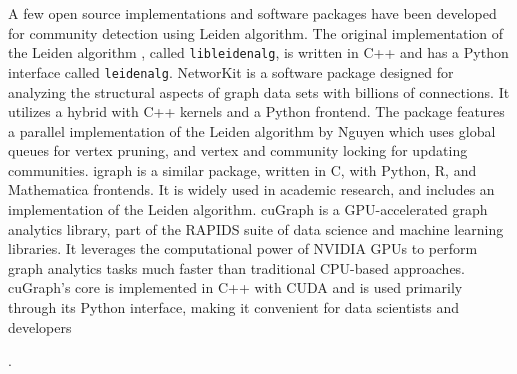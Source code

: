 A few open source implementations and software packages have been developed for community detection using Leiden algorithm. The original implementation of the Leiden algorithm \cite{com-traag19}, called \texttt{libleidenalg}, is written in C++ and has a Python interface called \texttt{leidenalg}. NetworKit \cite{staudt2016networkit} is a software package designed for analyzing the structural aspects of graph data sets with billions of connections. It utilizes a hybrid with C++ kernels and a Python frontend. The package features a parallel implementation of the Leiden algorithm by Nguyen \cite{nguyenleiden} which uses global queues for vertex pruning, and vertex and community locking for updating communities. igraph \cite{csardi2006igraph} is a similar package, written in C, with Python, R, and Mathematica frontends. It is widely used in academic research, and includes an implementation of the Leiden algorithm. cuGraph \cite{kang2023cugraph} is a GPU-accelerated graph analytics library, part of the RAPIDS suite of data science and machine learning libraries. It leverages the computational power of NVIDIA GPUs to perform graph analytics tasks much faster than traditional CPU-based approaches. cuGraph's core is implemented in C++ with CUDA and is used primarily through its Python interface, making it convenient for data scientists and developers.
